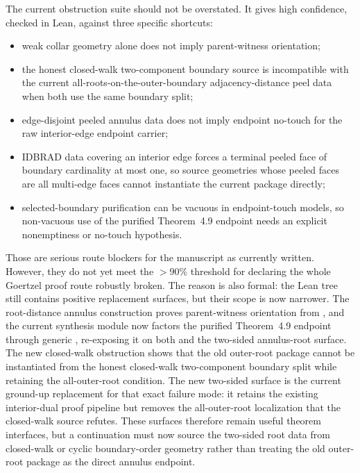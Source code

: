 \documentclass[11pt]{article}
\begin{document}
The current obstruction suite should not be overstated.  It gives high
confidence, checked in Lean, against three specific shortcuts:
\begin{itemize}[leftmargin=2em]
\item weak collar geometry alone does not imply parent-witness orientation;
\item the honest closed-walk two-component boundary source is incompatible
with the current all-roots-on-the-outer-boundary adjacency-distance peel data
when both use the same boundary split;
\item edge-disjoint peeled annulus data does not imply endpoint no-touch for
the raw interior-edge endpoint carrier;
\item IDBRAD data covering an interior edge forces a terminal peeled face of
boundary cardinality at most one, so source geometries whose peeled faces are
all multi-edge faces cannot instantiate the current package directly;
\item selected-boundary purification can be vacuous in endpoint-touch models,
so non-vacuous use of the purified Theorem~4.9 endpoint needs an explicit
nonemptiness or no-touch hypothesis.
\end{itemize}

Those are serious route blockers for the manuscript as currently written.
However, they do not yet meet the \(>90\%\) threshold for declaring the whole
Goertzel proof route robustly broken.  The reason is also formal: the Lean tree
still contains positive replacement surfaces, but their scope is now narrower.
The root-distance annulus construction proves parent-witness orientation from
, and the current synthesis
module now factors the purified Theorem~4.9 endpoint through generic
, re-exposing
it on both  and the
two-sided annulus-root surface.  The new closed-walk obstruction shows that
the old outer-root package cannot be instantiated from the honest closed-walk
two-component boundary split while retaining the all-outer-root condition.  The new two-sided
 surface is the current
ground-up replacement for that exact failure mode: it retains the existing
interior-dual proof pipeline but removes the all-outer-root localization that
the closed-walk source refutes.  These surfaces therefore remain useful
theorem interfaces, but a continuation must now source the two-sided root data
from closed-walk or cyclic boundary-order geometry rather than treating the
old outer-root package as the direct annulus endpoint.
\end{document}
